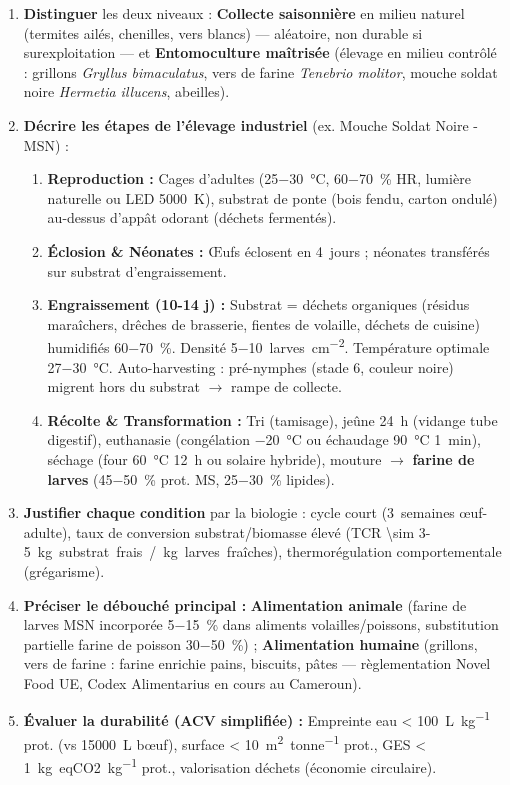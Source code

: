 \documentclass[11pt]{article}
\newcommand{\cle}[1]{{\popxbold\color{popdark}#1}}
\begin{document}
\begin{methode}
\begin{enumerate}
\item \textbf{Distinguer} les deux niveaux : \textbf{Collecte saisonnière} en milieu naturel (termites ailés, chenilles, vers blancs) — aléatoire, non durable si surexploitation — et \textbf{Entomoculture maîtrisée} (élevage en milieu contrôlé : grillons \emph{Gryllus bimaculatus}, vers de farine \emph{Tenebrio molitor}, mouche soldat noire \emph{Hermetia illucens}, abeilles).
\item \textbf{Décrire les étapes de l'élevage industriel} (ex. Mouche Soldat Noire - MSN) :
\begin{enumerate}
\item \textbf{Reproduction :} Cages d'adultes (\SI{25-30}{\celsius}, \SI{60-70}{\percent} HR, lumière naturelle ou LED \SI{5000}{K}), substrat de ponte (bois fendu, carton ondulé) au-dessus d'appât odorant (déchets fermentés).
\item \textbf{Éclosion \& Néonates :} Œufs éclosent en \SI{4}{jours} ; néonates transférés sur substrat d'engraissement.
\item \textbf{Engraissement (10-14 j) :} Substrat = déchets organiques (résidus maraîchers, drêches de brasserie, fientes de volaille, déchets de cuisine) humidifiés \SI{60-70}{\percent}. Densité \SI{5-10}{larves.cm^{-2}}. Température optimale \SI{27-30}{\celsius}. Auto-harvesting : pré-nymphes (stade 6, couleur noire) migrent hors du substrat $\rightarrow$ rampe de collecte.
\item \textbf{Récolte \& Transformation :} Tri (tamisage), jeûne \SI{24}{h} (vidange tube digestif), euthanasie (congélation \SI{-20}{\celsius} ou échaudage \SI{90}{\celsius} \SI{1}{min}), séchage (four \SI{60}{\celsius} \SI{12}{h} ou solaire hybride), mouture $\rightarrow$ \textbf{farine de larves} (\SI{45-50}{\percent} prot. MS, \SI{25-30}{\percent} lipides).
\end{enumerate}
\item \textbf{Justifier chaque condition} par la biologie : cycle court (\SI{3}{semaines} œuf-adulte), taux de conversion substrat/biomasse élevé (\cle{TCR} \SI{\sim 3-5}{kg substrat frais / kg larves fraîches}), thermorégulation comportementale (grégarisme).
\item \textbf{Préciser le débouché principal :} \textbf{Alimentation animale} (farine de larves MSN incorporée \SI{5-15}{\percent} dans aliments volailles/poissons, substitution partielle farine de poisson \SI{30-50}{\percent}) ; \textbf{Alimentation humaine} (grillons, vers de farine : farine enrichie pains, biscuits, pâtes — règlementation Novel Food UE, Codex Alimentarius en cours au Cameroun).
\item \textbf{Évaluer la durabilité (ACV simplifiée) :} Empreinte eau \SI{< 100}{L.kg^{-1}} prot. (vs \SI{15 000}{L} bœuf), surface \SI{< 10}{m^2.tonne^{-1}} prot., GES \SI{< 1}{kg eqCO2.kg^{-1}} prot., valorisation déchets (économie circulaire).
\end{enumerate}
\end{methode}
\end{document}
